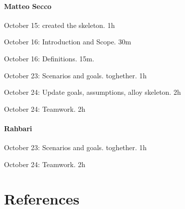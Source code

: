 \documentclass{article}
\begin{document}
	\paragraph{Matteo Secco} 
		\begin{list}{-}{}
			\item October 15: created the skeleton. 1h
			\item October 16: Introduction and Scope. 30m
			\item October 16: Definitions. 15m.
			\item October 23: Scenarios and goals. toghether. 1h
			\item October 24: Update goals, assumptions, alloy skeleton. 2h
			\item October 24: Teamwork. 2h
		\end{list}
	\paragraph{Rahbari}
		\begin{list}{-}{}
			\item October 23: Scenarios and goals. toghether. 1h
			\item October 24: Teamwork. 2h
		\end{list}
\section{References}
\end{document}
